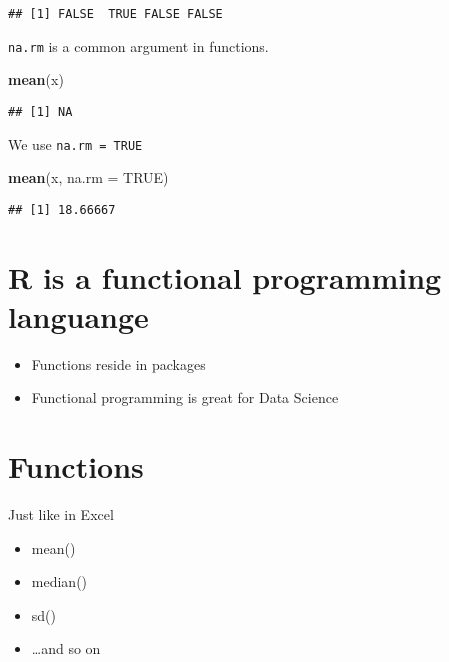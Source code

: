 \documentclass[]{book}
\newenvironment{Shaded}{\begin{snugshade}}{\end{snugshade}}
\newcommand{\DataTypeTok}[1]{\textcolor[rgb]{0.13,0.29,0.53}{#1}}
\newcommand{\KeywordTok}[1]{\textcolor[rgb]{0.13,0.29,0.53}{\textbf{#1}}}
\newcommand{\NormalTok}[1]{#1}
\newcommand{\OtherTok}[1]{\textcolor[rgb]{0.56,0.35,0.01}{#1}}
\providecommand{\tightlist}{%
  \setlength{\itemsep}{0pt}\setlength{\parskip}{0pt}}
\begin{document}
\begin{verbatim}
## [1] FALSE  TRUE FALSE FALSE
\end{verbatim}

\texttt{na.rm} is a common argument in functions.

\begin{Shaded}
\begin{Highlighting}[]
\KeywordTok{mean}\NormalTok{(x)}
\end{Highlighting}
\end{Shaded}

\begin{verbatim}
## [1] NA
\end{verbatim}

We use \texttt{na.rm\ =\ TRUE}

\begin{Shaded}
\begin{Highlighting}[]
\KeywordTok{mean}\NormalTok{(x, }\DataTypeTok{na.rm =} \OtherTok{TRUE}\NormalTok{)}
\end{Highlighting}
\end{Shaded}

\begin{verbatim}
## [1] 18.66667
\end{verbatim}

\hypertarget{r-is-a-functional-programming-languange}{%
\section{R is a functional programming languange}\label{r-is-a-functional-programming-languange}}

\begin{itemize}
\tightlist
\item
  Functions reside in packages
\item
  Functional programming is great for Data Science
\end{itemize}

\hypertarget{functions}{%
\section{Functions}\label{functions}}

Just like in Excel

\begin{itemize}
\tightlist
\item
  mean()
\item
  median()
\item
  sd()
\item
  \ldots{}and so on
\end{itemize}
\end{document}
